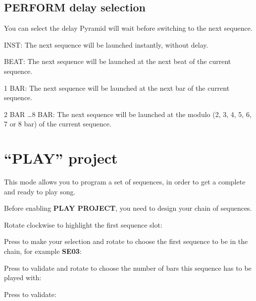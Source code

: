 \subsection{PERFORM delay selection}

You can select the delay Pyramid will wait before switching to the next sequence.


INST: The next sequence will be launched instantly, without delay.

BEAT: The next sequence will be launched at the next beat of the current sequence.

1 BAR: The next sequence will be launched at the next bar of the current sequence.

2 BAR \ldots 8 BAR: The next sequence will be launched at the modulo (2, 3, 4, 5, 6, 7 or 8 bar) of the current sequence.


\section{``PLAY'' project}

This mode allows you to program a set of sequences, in order to get a complete and ready to play song.

Before enabling \textbf{PLAY PROJECT}, you need to design your chain of sequences.

Rotate clockwise \encodericon{} to highlight the first sequence slot:


Press \encodericon{} to make your selection and rotate \encodericon{} to choose the first sequence to be in the chain, for example \textbf{SE03}:


Press \encodericon{} to validate and rotate \encodericon{} to choose the number of bars this sequence has to be played with:



Press \encodericon{} to validate:


